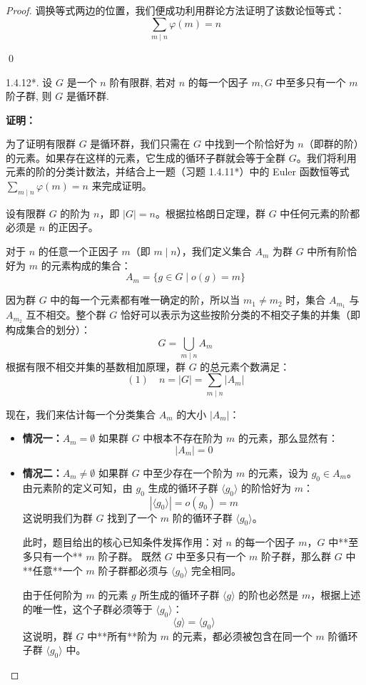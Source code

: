 \documentclass[]{article}
\begin{document}
\begin{proof}
调换等式两边的位置，我们便成功利用群论方法证明了该数论恒等式：
\[ \sum_{m \mid n} \varphi(m) = n \]

\qed

1.4.12*. 设 $G$ 是一个 $n$ 阶有限群, 若对 $n$ 的每一个因子 $m, G$ 中至多只有一个 $m$ 阶子群, 则 $G$ 是循环群. 

\bigskip
\noindent \textbf{证明：} 

为了证明有限群 $G$ 是循环群，我们只需在 $G$ 中找到一个阶恰好为 $n$（即群的阶）的元素。如果存在这样的元素，它生成的循环子群就会等于全群 $G$。我们将利用元素的阶的分类计数法，并结合上一题（习题 1.4.11*）中的 Euler 函数恒等式 $\sum_{m \mid n} \varphi(m) = n$ 来完成证明。

\bigskip
设有限群 $G$ 的阶为 $n$，即 $|G| = n$。根据拉格朗日定理，群 $G$ 中任何元素的阶都必须是 $n$ 的正因子。

对于 $n$ 的任意一个正因子 $m$（即 $m \mid n$），我们定义集合 $A_m$ 为群 $G$ 中所有阶恰好为 $m$ 的元素构成的集合：
\[ A_m = \{ g \in G \mid o(g) = m \} \]

因为群 $G$ 中的每一个元素都有唯一确定的阶，所以当 $m_1 \neq m_2$ 时，集合 $A_{m_1}$ 与 $A_{m_2}$ 互不相交。整个群 $G$ 恰好可以表示为这些按阶分类的不相交子集的并集（即构成集合的划分）：
\[ G = \bigcup_{m \mid n} A_m \]
根据有限不相交并集的基数相加原理，群 $G$ 的总元素个数满足：
\[ (1) \quad n = |G| = \sum_{m \mid n} |A_m| \]

现在，我们来估计每一个分类集合 $A_m$ 的大小 $|A_m|$：
\begin{itemize}
	\item \textbf{情况一：$A_m = \emptyset$}
	如果群 $G$ 中根本不存在阶为 $m$ 的元素，那么显然有：
	\[ |A_m| = 0 \]
	
	\item \textbf{情况二：$A_m \neq \emptyset$}
	如果群 $G$ 中至少存在一个阶为 $m$ 的元素，设为 $g_0 \in A_m$。由元素阶的定义可知，由 $g_0$ 生成的循环子群 $\langle g_0 \rangle$ 的阶恰好为 $m$：
	\[ |\langle g_0 \rangle| = o(g_0) = m \]
	这说明我们为群 $G$ 找到了一个 $m$ 阶的循环子群 $\langle g_0 \rangle$。
	
	此时，题目给出的核心已知条件发挥作用：对 $n$ 的每一个因子 $m$，$G$ 中**至多只有一个** $m$ 阶子群。
	既然 $G$ 中至多只有一个 $m$ 阶子群，那么群 $G$ 中**任意**一个 $m$ 阶子群都必须与 $\langle g_0 \rangle$ 完全相同。
	
	由于任何阶为 $m$ 的元素 $g$ 所生成的循环子群 $\langle g \rangle$ 的阶也必然是 $m$，根据上述的唯一性，这个子群必须等于 $\langle g_0 \rangle$：
	\[ \langle g \rangle = \langle g_0 \rangle \]
	这说明，群 $G$ 中**所有**阶为 $m$ 的元素，都必须被包含在同一个 $m$ 阶循环子群 $\langle g_0 \rangle$ 中。
	

\end{itemize}
\end{proof}
\end{document}

